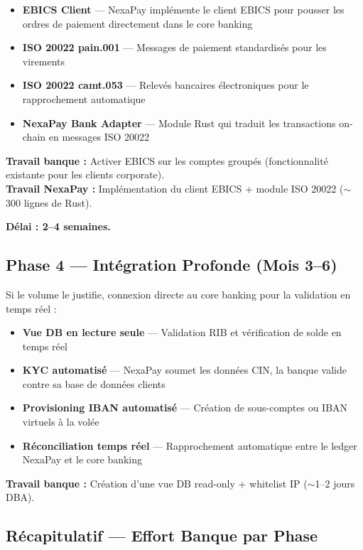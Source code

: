 \documentclass[11pt,a4paper]{article}
\begin{document}
\begin{itemize}[leftmargin=*]
    \item \textbf{EBICS Client} --- NexaPay impl\'emente le client EBICS pour pousser les ordres de paiement directement dans le core banking
    \item \textbf{ISO 20022 pain.001} --- Messages de paiement standardis\'es pour les virements
    \item \textbf{ISO 20022 camt.053} --- Relev\'es bancaires \'electroniques pour le rapprochement automatique
    \item \textbf{NexaPay Bank Adapter} --- Module Rust qui traduit les transactions on-chain en messages ISO 20022
\end{itemize}

\textbf{Travail banque :} Activer EBICS sur les comptes group\'es (fonctionnalit\'e existante pour les clients corporate). \\
\textbf{Travail NexaPay :} Impl\'ementation du client EBICS + module ISO 20022 ($\sim$300 lignes de Rust).

\textbf{D\'elai : 2--4 semaines.}

\subsection{Phase 4 --- Int\'egration Profonde (Mois 3--6)}

Si le volume le justifie, connexion directe au core banking pour la validation en temps r\'eel :

\begin{itemize}[leftmargin=*]
    \item \textbf{Vue DB en lecture seule} --- Validation RIB et v\'erification de solde en temps r\'eel
    \item \textbf{KYC automatis\'e} --- NexaPay soumet les donn\'ees CIN, la banque valide contre sa base de donn\'ees clients
    \item \textbf{Provisioning IBAN automatis\'e} --- Cr\'eation de sous-comptes ou IBAN virtuels \`a la vol\'ee
    \item \textbf{R\'econciliation temps r\'eel} --- Rapprochement automatique entre le ledger NexaPay et le core banking
\end{itemize}

\textbf{Travail banque :} Cr\'eation d'une vue DB read-only + whitelist IP ($\sim$1--2 jours DBA).

\subsection{R\'ecapitulatif --- Effort Banque par Phase}
\end{document}
